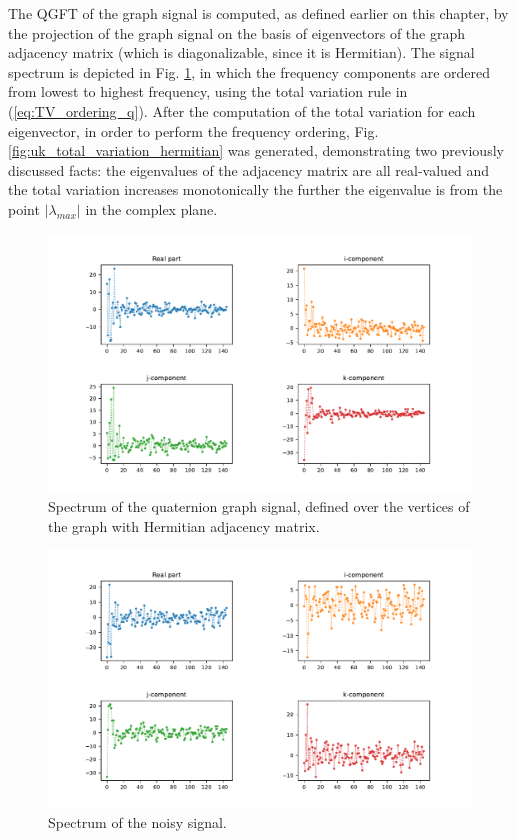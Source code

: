 The QGFT of the graph signal is computed, as defined earlier on this chapter, by the projection of the graph signal on the basis of eigenvectors of the graph adjacency matrix (which is diagonalizable, since it is Hermitian). The signal spectrum is depicted in Fig. \ref{fig:uk_qgsp_spectrum_hermitian}, in which the frequency components are ordered from lowest to highest frequency, using the total variation rule in (\ref{eq:TV_ordering_q}). After the computation of the total variation for each eigenvector, in order to perform the frequency ordering, Fig. \ref{fig:uk_total_variation_hermitian} was generated, demonstrating two previously discussed facts: the eigenvalues of the adjacency matrix are all real-valued and the total variation increases monotonically the further the eigenvalue is from the point $|\lambda_{max}|$ in the complex plane.

\begin{figure}
\centering
\includegraphics[width=\linewidth]{thesis/Figures/uk_example/uk_spectrum_hermitian.pdf}
\caption{Spectrum of the quaternion graph signal, defined over the vertices of the graph with Hermitian adjacency matrix.}
\label{fig:uk_qgsp_spectrum_hermitian}
\end{figure}

\begin{figure}
\centering
\includegraphics[width=\linewidth]{thesis/Figures/uk_example/uk_spectrum_noisy.pdf}
\caption{Spectrum of the noisy signal.}
\label{fig:uk_spectrum_noisy}
\end{figure}


